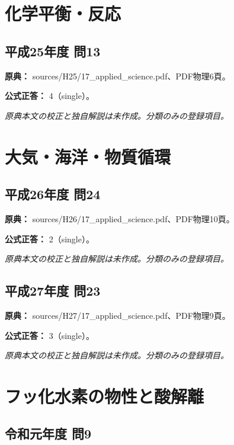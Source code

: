 \section{化学平衡・反応}

\subsection{平成25年度 問13}
\label{q:h25-reg-applied-13}

\noindent\textbf{原典：} sources/H25/17\_applied\_science.pdf、PDF物理6頁。

\textbf{公式正答：} 4（single）。

\par\textit{原典本文の校正と独自解説は未作成。分類のみの登録項目。}

\section{大気・海洋・物質循環}

\subsection{平成26年度 問24}
\label{q:h26-reg-applied-24}

\noindent\textbf{原典：} sources/H26/17\_applied\_science.pdf、PDF物理10頁。

\textbf{公式正答：} 2（single）。

\par\textit{原典本文の校正と独自解説は未作成。分類のみの登録項目。}

\subsection{平成27年度 問23}
\label{q:h27-reg-applied-23}

\noindent\textbf{原典：} sources/H27/17\_applied\_science.pdf、PDF物理9頁。

\textbf{公式正答：} 3（single）。

\par\textit{原典本文の校正と独自解説は未作成。分類のみの登録項目。}

\section{フッ化水素の物性と酸解離}

\subsection{令和元年度 問9}
\label{q:r01-reg-applied-09}

